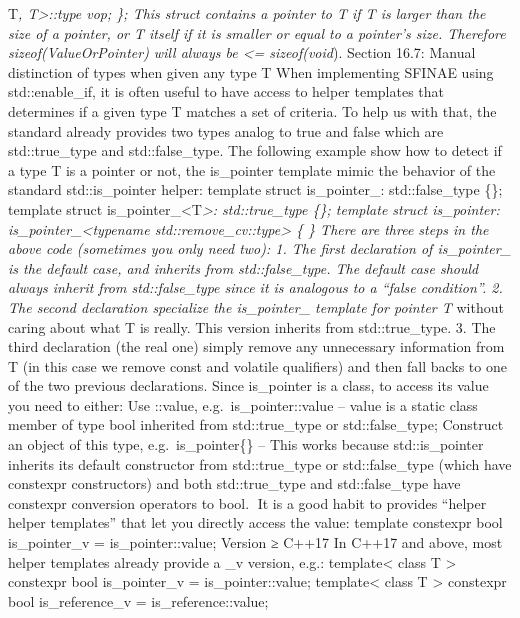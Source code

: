 T\emph{, T\textgreater::type vop; \}; This struct contains a pointer to
T if T is larger than the size of a pointer, or T itself if it is
smaller or equal to a pointer's size. Therefore sizeof(ValueOrPointer)
will always be \textless= sizeof(void}). Section 16.7: Manual
distinction of types when given any type T When implementing SFINAE
using std::enable\_if, it is often useful to have access to helper
templates that determines if a given type T matches a set of criteria.
To help us with that, the standard already provides two types analog to
true and false which are std::true\_type and std::false\_type. The
following example show how to detect if a type T is a pointer or not,
the is\_pointer template mimic the behavior of the standard
std::is\_pointer helper: template struct is\_pointer\_: std::false\_type
\{\}; template struct is\_pointer\_\textless T\emph{\textgreater:
std::true\_type \{\}; template struct is\_pointer:
is\_pointer\_\textless typename std::remove\_cv::type\textgreater{} \{
\} There are three steps in the above code (sometimes you only need
two): 1. The ﬁrst declaration of is\_pointer\_ is the default case, and
inherits from std::false\_type. The default case should always inherit
from std::false\_type since it is analogous to a ``false condition''. 2.
The second declaration specialize the is\_pointer\_ template for pointer
T} without caring about what T is really. This version inherits from
std::true\_type. 3. The third declaration (the real one) simply remove
any unnecessary information from T (in this case we remove const and
volatile qualiﬁers) and then fall backs to one of the two previous
declarations. Since is\_pointer is a class, to access its value you need
to either: Use ::value, e.g.~is\_pointer::value -- value is a static
class member of type bool inherited from std::true\_type or
std::false\_type; Construct an object of this type, e.g.~is\_pointer\{\}
-- This works because std::is\_pointer inherits its default constructor
from std::true\_type or std::false\_type (which have constexpr
constructors) and both std::true\_type and std::false\_type have
constexpr conversion operators to bool. It is a good habit to provides
``helper helper templates'' that let you directly access the value:
template constexpr bool is\_pointer\_v = is\_pointer::value; Version ≥
C++17 In C++17 and above, most helper templates already provide a \_v
version, e.g.: template\textless{} class T \textgreater{} constexpr bool
is\_pointer\_v = is\_pointer::value; template\textless{} class T
\textgreater{} constexpr bool is\_reference\_v = is\_reference::value;

